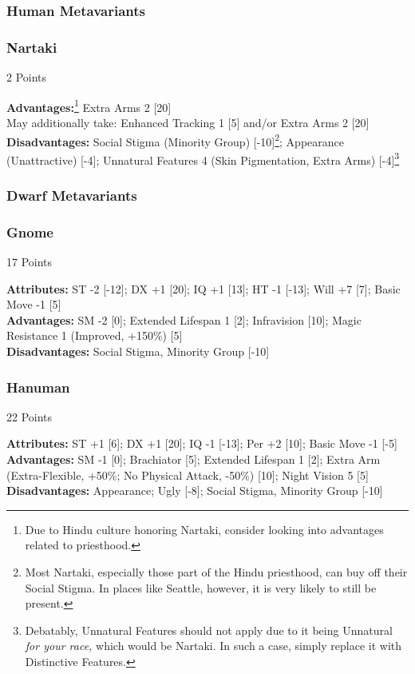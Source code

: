 \begin{multicols*}{3}
	\subsubsection{Human Metavariants}
	
	\subsubsection*{Nartaki}
	\begin{flushright}
		2 Points
	\end{flushright}
	\textbf{Advantages:}\footnote{Due to Hindu culture honoring Nartaki, consider looking into advantages related to priesthood.} 
	Extra Arms 2 [20]
	\\May additionally take: Enhanced Tracking 1 [5] and/or Extra Arms 2 [20]
	\\\textbf{Disadvantages:} 
	Social Stigma (Minority Group) [-10]\footnote{Most Nartaki, especially those part of the Hindu priesthood, can buy off their Social Stigma. In places like Seattle, however, it is very likely to still be present.}; Appearance (Unattractive) [-4]; Unnatural Features 4 (Skin Pigmentation, Extra Arms) [-4]\footnote{Debatably, Unnatural Features should not apply due to it being Unnatural \textit{for your race,} which would be Nartaki. In such a case, simply replace it with Distinctive Features.}
	
	\subsubsection{Dwarf Metavariants}
	
	\subsubsection*{Gnome}
	\begin{flushright}
		17 Points
	\end{flushright}
	\textbf{Attributes:}
	ST -2 [-12]; DX +1 [20]; IQ +1 [13]; HT -1 [-13]; Will +7 [7]; Basic Move -1 [5]
	\\\textbf{Advantages:}
	SM -2 [0]; Extended Lifespan 1 [2]; Infravision [10]; Magic Resistance 1 (Improved, +150\%) [5]
	\\\textbf{Disadvantages:} 
	Social Stigma, Minority Group [-10]
	
	\subsubsection*{Hanuman}
	\begin{flushright}
		22 Points
	\end{flushright}
	\textbf{Attributes:}
	ST +1 [6]; DX +1 [20]; IQ -1 [-13]; Per +2 [10]; Basic Move -1 [-5]
	\\\textbf{Advantages:}
	SM -1 [0]; Brachiator [5]; Extended Lifespan 1 [2]; Extra Arm (Extra-Flexible, +50\%; No Physical Attack, -50\%) [10]; Night Vision 5 [5]
	\\\textbf{Disadvantages:} 
	Appearance; Ugly [-8]; Social Stigma, Minority Group [-10]
	

\end{multicols*}
